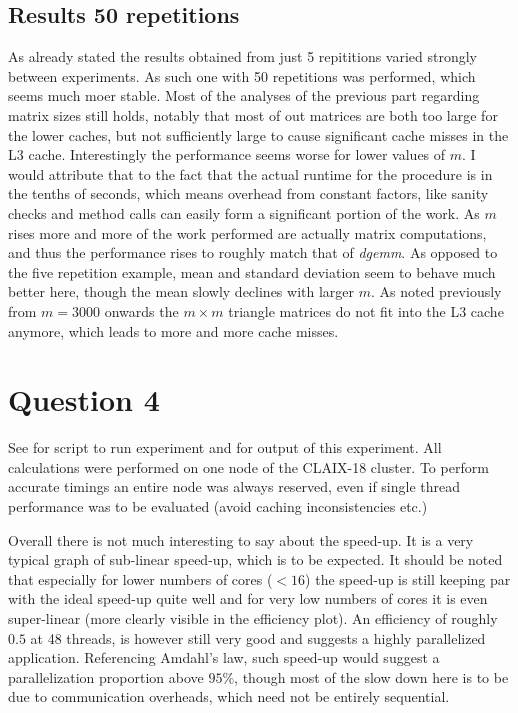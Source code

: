 \documentclass{scrartcl}
\begin{document}
\subsection{Results 50 repetitions}
As already stated the results obtained from just 5 repititions varied strongly between experiments.
As such one with 50 repetitions was performed, which seems much moer stable.
Most of the analyses of the previous part regarding matrix sizes still holds, notably that most of out matrices are both too large for the lower caches, but not sufficiently large to cause significant cache misses in the L3 cache.
Interestingly the performance seems worse for lower values of $m$. 
I would attribute that to the fact that the actual runtime for the procedure is in the tenths of seconds, which means overhead from constant factors, like sanity checks and method calls can easily form a significant portion of the work.
As $m$ rises more and more of the work performed are actually matrix computations, and thus the performance rises to roughly match that of \emph{dgemm}.
As opposed to the five repetition example, mean and standard deviation seem to behave much better here, though the mean slowly declines with larger $m$.
As noted previously from $m=3000$ onwards the $m\times m$ triangle matrices do not fit into the L3 cache anymore, which leads to more and more cache misses.

\section{Question 4}
See  for script to run experiment and  for output of this experiment.
All calculations were performed on one node of the CLAIX-18 cluster.
To perform accurate timings an entire node was always reserved, even if single thread performance was to be evaluated (avoid caching inconsistencies etc.)

Overall there is not much interesting to say about the speed-up. 
It is a very typical graph of sub-linear speed-up, which is to be expected.
It should be noted that especially for lower numbers of cores ($<16$) the speed-up is still keeping par with the ideal speed-up quite well and for very low numbers of cores it is even super-linear (more clearly visible in the efficiency plot).
An efficiency of roughly $0.5$ at 48 threads, is however still very good and suggests a highly parallelized application.
Referencing Amdahl's law, such speed-up would suggest a parallelization proportion above $95\%$, though most of the slow down here is to be due to communication overheads, which need not be entirely sequential.
\end{document}
